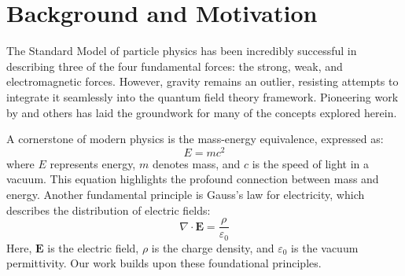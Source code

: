 \section{Background and Motivation}
\label{sec:background}
The Standard Model of particle physics has been incredibly successful in describing three of the four fundamental forces: the strong, weak, and electromagnetic forces. However, gravity remains an outlier, resisting attempts to integrate it seamlessly into the quantum field theory framework. Pioneering work by \citet{Doe2022} and others has laid the groundwork for many of the concepts explored herein.

A cornerstone of modern physics is the mass-energy equivalence, expressed as:
\[ E = mc^2 \]
where \(E\) represents energy, \(m\) denotes mass, and \(c\) is the speed of light in a vacuum. This equation highlights the profound connection between mass and energy. Another fundamental principle is Gauss's law for electricity, which describes the distribution of electric fields:
\[ \nabla \cdot \mathbf{E} = \frac{\rho}{\varepsilon_0} \]
Here, \(\mathbf{E}\) is the electric field, \(\rho\) is the charge density, and \(\varepsilon_0\) is the vacuum permittivity. Our work builds upon these foundational principles.
\blindtext[1]

